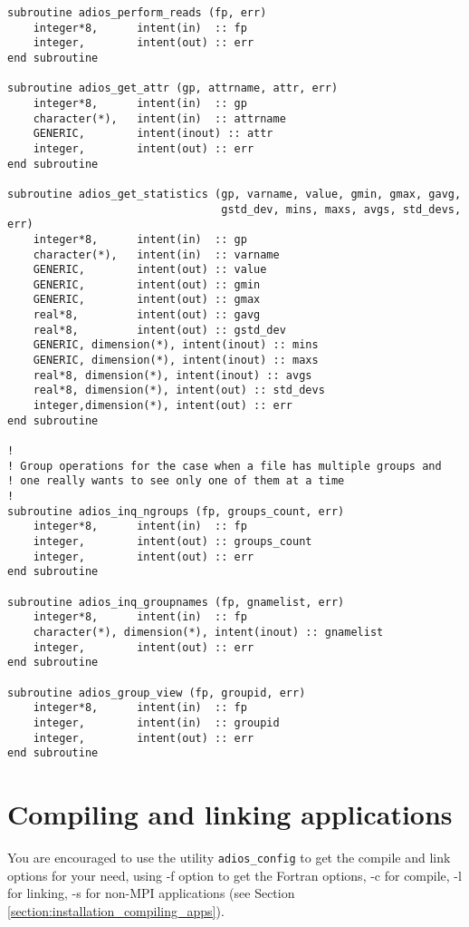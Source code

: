 \begin{lstlisting}[language=ADIOS,alsolanguage=Fortran]
subroutine adios_perform_reads (fp, err)
    integer*8,      intent(in)  :: fp
    integer,        intent(out) :: err
end subroutine

subroutine adios_get_attr (gp, attrname, attr, err)
    integer*8,      intent(in)  :: gp
    character(*),   intent(in)  :: attrname
    GENERIC,        intent(inout) :: attr
    integer,        intent(out) :: err
end subroutine

subroutine adios_get_statistics (gp, varname, value, gmin, gmax, gavg, 
                                 gstd_dev, mins, maxs, avgs, std_devs, err)
    integer*8,      intent(in)  :: gp
    character(*),   intent(in)  :: varname
    GENERIC,        intent(out) :: value
    GENERIC,        intent(out) :: gmin
    GENERIC,        intent(out) :: gmax
    real*8,         intent(out) :: gavg
    real*8,         intent(out) :: gstd_dev
    GENERIC, dimension(*), intent(inout) :: mins
    GENERIC, dimension(*), intent(inout) :: maxs
    real*8, dimension(*), intent(inout) :: avgs
    real*8, dimension(*), intent(out) :: std_devs
    integer,dimension(*), intent(out) :: err
end subroutine

!
! Group operations for the case when a file has multiple groups and 
! one really wants to see only one of them at a time
!
subroutine adios_inq_ngroups (fp, groups_count, err)
    integer*8,      intent(in)  :: fp
    integer,        intent(out) :: groups_count
    integer,        intent(out) :: err
end subroutine

subroutine adios_inq_groupnames (fp, gnamelist, err)
    integer*8,      intent(in)  :: fp
    character(*), dimension(*), intent(inout) :: gnamelist
    integer,        intent(out) :: err
end subroutine

subroutine adios_group_view (fp, groupid, err)
    integer*8,      intent(in)  :: fp
    integer,        intent(in)  :: groupid
    integer,        intent(out) :: err
end subroutine

\end{lstlisting}



\section{Compiling and linking applications}

You are encouraged to use the utility \verb+adios_config+ to get the compile and link options for your 
need, using -f option to get the Fortran options, -c for compile, -l for linking, 
-s for non-MPI applications (see Section \ref{section:installation_compiling_apps}). 


